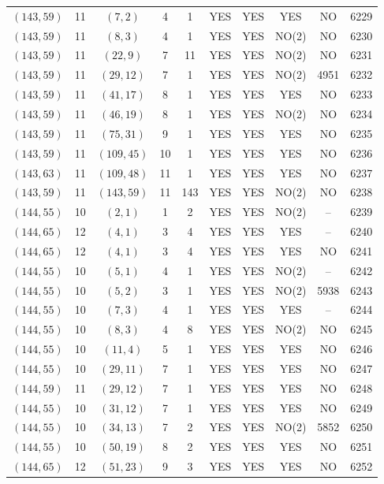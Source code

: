 \begin{longtable}{|c|c|c|c|c|c|c|c|c|c|}
$(143, 59)$ & 11 & $(7, 2)$ & 4 & 1 & YES & YES & YES & NO & 6229\\
$(143, 59)$ & 11 & $(8, 3)$ & 4 & 1 & YES & YES & NO(2) & NO & 6230\\
$(143, 59)$ & 11 & $(22, 9)$ & 7 & 11 & YES & YES & NO(2) & NO & 6231\\
$(143, 59)$ & 11 & $(29, 12)$ & 7 & 1 & YES & YES & NO(2) & 4951 & 6232\\
$(143, 59)$ & 11 & $(41, 17)$ & 8 & 1 & YES & YES & YES & NO & 6233\\
$(143, 59)$ & 11 & $(46, 19)$ & 8 & 1 & YES & YES & NO(2) & NO & 6234\\
$(143, 59)$ & 11 & $(75, 31)$ & 9 & 1 & YES & YES & YES & NO & 6235\\
$(143, 59)$ & 11 & $(109, 45)$ & 10 & 1 & YES & YES & YES & NO & 6236\\
$(143, 63)$ & 11 & $(109, 48)$ & 11 & 1 & YES & YES & YES & NO & 6237\\
$(143, 59)$ & 11 & $(143, 59)$ & 11 & 143 & YES & YES & NO(2) & NO & 6238\\
$(144, 55)$ & 10 & $(2, 1)$ & 1 & 2 & YES & YES & NO(2) & -- & 6239\\
$(144, 65)$ & 12 & $(4, 1)$ & 3 & 4 & YES & YES & YES & -- & 6240\\
$(144, 65)$ & 12 & $(4, 1)$ & 3 & 4 & YES & YES & YES & NO & 6241\\
$(144, 55)$ & 10 & $(5, 1)$ & 4 & 1 & YES & YES & NO(2) & -- & 6242\\
$(144, 55)$ & 10 & $(5, 2)$ & 3 & 1 & YES & YES & NO(2) & 5938 & 6243\\
$(144, 55)$ & 10 & $(7, 3)$ & 4 & 1 & YES & YES & YES & -- & 6244\\
$(144, 55)$ & 10 & $(8, 3)$ & 4 & 8 & YES & YES & NO(2) & NO & 6245\\
$(144, 55)$ & 10 & $(11, 4)$ & 5 & 1 & YES & YES & YES & NO & 6246\\
$(144, 55)$ & 10 & $(29, 11)$ & 7 & 1 & YES & YES & YES & NO & 6247\\
$(144, 59)$ & 11 & $(29, 12)$ & 7 & 1 & YES & YES & YES & NO & 6248\\
$(144, 55)$ & 10 & $(31, 12)$ & 7 & 1 & YES & YES & YES & NO & 6249\\
$(144, 55)$ & 10 & $(34, 13)$ & 7 & 2 & YES & YES & NO(2) & 5852 & 6250\\
$(144, 55)$ & 10 & $(50, 19)$ & 8 & 2 & YES & YES & YES & NO & 6251\\
$(144, 65)$ & 12 & $(51, 23)$ & 9 & 3 & YES & YES & YES & NO & 6252\\

\end{longtable}
